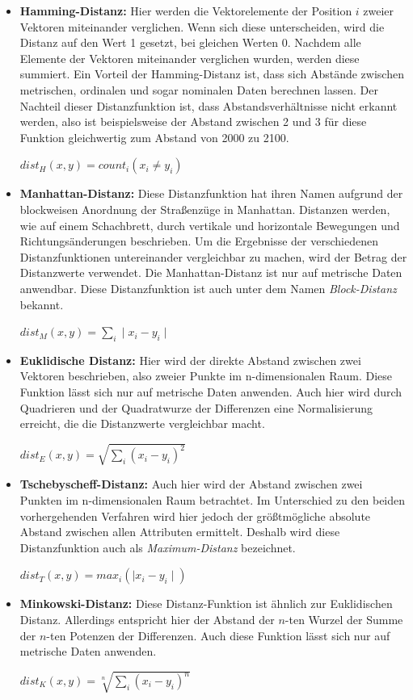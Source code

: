 \begin{itemize}
\item \textbf{Hamming-Distanz:} Hier werden die Vektorelemente der Position \(i\) zweier Vektoren miteinander verglichen. Wenn sich diese unterscheiden, wird die Distanz auf den Wert 1 gesetzt, bei gleichen Werten 0. Nachdem alle Elemente der Vektoren miteinander verglichen wurden, werden diese summiert. Ein Vorteil der Hamming-Distanz ist, dass sich Abstände zwischen metrischen, ordinalen und sogar nominalen Daten berechnen lassen. Der Nachteil dieser Distanzfunktion ist, dass Abstandsverhältnisse nicht erkannt werden, also ist beispielsweise der Abstand zwischen 2 und 3 für diese Funktion gleichwertig zum Abstand von 2000 zu 2100.

\(dist_H(x,y) = count_i(x_i \neq y_i) \)

\item \textbf{Manhattan-Distanz:} Diese Distanzfunktion hat ihren Namen aufgrund der blockweisen Anordnung der Straßenzüge in Manhattan. Distanzen werden, wie auf einem Schachbrett, durch vertikale und horizontale Bewegungen und Richtungsänderungen beschrieben. Um die Ergebnisse der verschiedenen Distanzfunktionen untereinander vergleichbar zu machen, wird der Betrag der Distanzwerte verwendet. Die Manhattan-Distanz ist nur auf metrische Daten anwendbar. Diese Distanzfunktion ist auch unter dem Namen \textit{Block-Distanz} bekannt.   

\(dist_M(x,y) = \sum_{i} \mid x_i - y_i \mid \)


\item \textbf{Euklidische Distanz:} Hier wird der direkte Abstand zwischen zwei Vektoren beschrieben, also zweier Punkte im n-dimensionalen Raum. Diese Funktion lässt sich nur auf metrische Daten anwenden. Auch hier wird durch Quadrieren und der Quadratwurze der Differenzen eine Normalisierung erreicht, die die Distanzwerte vergleichbar macht. 

\(dist_E(x,y) = \sqrt{\sum_{i}(x_i - y_i)^2} \)

\item \textbf{Tschebyscheff-Distanz:}  Auch hier wird der Abstand zwischen zwei Punkten im n-dimensionalen Raum betrachtet. Im Unterschied zu den beiden vorhergehenden Verfahren wird hier jedoch der größtmögliche absolute Abstand zwischen allen Attributen ermittelt. Deshalb wird diese Distanzfunktion auch als \textit{Maximum-Distanz}  bezeichnet. 

\(dist_T(x,y) = max_i(\mid x_i - y_i \mid) \)

\item \textbf{Minkowski-Distanz:}  Diese Distanz-Funktion ist ähnlich zur Euklidischen Distanz. Allerdings entspricht hier der Abstand der \(n\)-ten Wurzel der Summe der  \(n\)-ten Potenzen der Differenzen. Auch diese Funktion lässt sich nur auf metrische Daten anwenden.

\(dist_K(x,y) = \sqrt[n]{\sum_{i}(x_i - y_i)^n} \)

\end{itemize}

